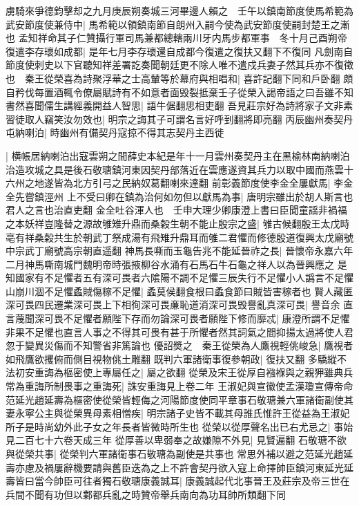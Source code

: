虜騎來爭德鈞擊却之九月庚辰朔奏城三河畢邊人賴之　壬午以鎮南節度使馬希範為武安節度使兼侍中|{
	馬希範以領鎮南節自朗州入嗣今使為武安節度使嗣封楚王之漸也}
孟知祥命其子仁贊攝行軍司馬兼都總轄兩川牙内馬步都軍事　冬十月己酉朔帝復遣李存瓌如成都|{
	是年七月李存瓌還自成都今復遣之復扶又翻下不復同}
凡劍南自節度使刺史以下官聽知祥差署訖奏聞朝廷更不除人唯不遣戍兵妻子然其兵亦不復徵也　秦王從榮喜為詩聚浮華之士高輦等於幕府與相唱和|{
	喜許記翻下同和戶卧翻}
頗自矜伐每置酒輒令僚屬賦詩有不如意者面毁裂抵棄壬子從榮入謁帝語之曰吾雖不知書然喜聞儒生講經義開益人智思|{
	語牛倨翻思相吏翻}
吾見莊宗好為詩將家子文非素習徒取人竊笑汝勿效也|{
	明宗之誨其子可謂名言好呼到翻將即亮翻}
丙辰幽州奏契丹屯納喇泊|{
	時幽州有備契丹寇掠不得其志契丹主西徙}


|{
	横帳居納喇泊出寇雲朔之間薛史本紀是年十一月雲州奏契丹主在黑榆林南納喇泊治造攻城之具是後石敬瑭鎮河東因契丹部落近在雲應遂資其兵力以取中國而燕雲十六州之地遂皆為北方引弓之民納奴葛翻喇來達翻}
前彰義節度使李金全屢獻馬|{
	李金全先嘗鎮涇州}
上不受曰卿在鎮為治何如勿但以獻馬為事|{
	唐明宗雖出於胡人斯言也君人之言也治直吏翻}
金全吐谷渾人也　壬申大理少卿康澄上書曰臣聞童謡非禍福之本妖祥豈隆替之源故雊雉升鼎而桑榖生朝不能止殷宗之盛|{
	雊古候翻殷王太戊時亳有祥桑榖共生於朝武丁祭成湯有飛雉升鼎耳而雊二君懼而修德殷道復興太戊廟號中宗武丁廟號高宗朝直遥翻}
神馬長嘶而玉龜告兆不能延晉祚之長|{
	晉懷帝永嘉六年二月神馬嘶南城門魏明帝時張掖柳谷水涌有石馬石牛石龜之祥人以為晉興應之}
是知國家有不足懼者五有深可畏者六隂陽不調不足懼三辰失行不足懼小人譌言不足懼山崩川涸不足懼蟊賊傷稼不足懼|{
	蟊莫侯翻食根曰蟊食節曰賊皆害稼者也}
賢人藏匿深可畏四民遷業深可畏上下相徇深可畏亷恥道消深可畏毁譽亂真深可畏|{
	譽音余}
直言蔑聞深可畏不足懼者願陛下存而勿論深可畏者願陛下修而靡忒|{
	康澄所謂不足懼非果不足懼也直言人事之不得其可畏有甚于所懼者然其詞氣之間抑揚太過將使人君忽于變異災傷而不知警省非篤論也}
優詔奬之　秦王從榮為人鷹視輕佻峻急|{
	鷹視者如飛鷹欲攫俯而側目視物佻土雕翻}
既判六軍諸衛事復參朝政|{
	復扶又翻}
多驕縱不法初安重誨為樞密使上專屬任之|{
	屬之欲翻}
從榮及宋王從厚自襁褓與之親狎雖典兵常為重誨所制畏事之重誨死|{
	誅安重誨見上卷二年}
王淑妃與宣徽使孟漢瓊宣傳帝命范延光趙延壽為樞密使從榮皆輕侮之河陽節度使同平章事石敬瑭兼六軍諸衛副使其妻永寧公主與從榮異母素相憎疾|{
	明宗諸子史皆不載其母誰氏惟許王從益為王淑妃所子是時尚幼外此子女之年長者皆微時所生也}
從榮以從厚聲名出已右尤忌之|{
	事始見二百七十六卷天成三年}
從厚善以卑弱奉之故嫌隙不外見|{
	見賢遍翻}
石敬瑭不欲與從榮共事|{
	從榮判六軍諸衛事石敬瑭為副使是共事也}
常思外補以避之范延光趙延壽亦慮及禍屢辭機要請與舊臣迭為之上不許會契丹欲入寇上命擇帥臣鎮河東延光延壽皆曰當今帥臣可往者獨石敬瑭康義誠耳|{
	康義誠起代北事晉王及莊宗及帝三世在兵間不聞有功但以鄴都兵亂之時贊帝舉兵南向為功耳帥所類翻下同}
